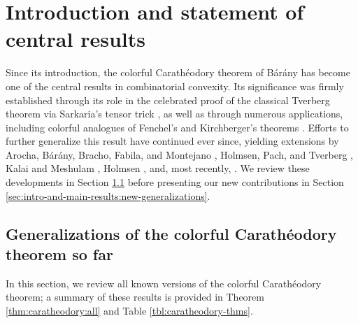 \documentclass[a4paper,11pt,reqno, english]{amsart}
\theoremstyle{definition}
\theoremstyle{remark}
\begin{document}
\maketitle


\bigskip
\section{Introduction and statement of central results}\label{sec:intro-and-main-results}
\bigskip

Since its introduction, the colorful Carath\'eodory theorem of B\'ar\'any \cite{Barany1982} has become one of the central results in combinatorial convexity. 
Its significance was firmly established through its role in the celebrated proof of the classical Tverberg theorem \cite{Tverberg1966} via Sarkaria’s tensor trick \cite{Sarkaria1992}, as well as through numerous applications, including colorful analogues of Fenchel’s and Kirchberger’s theorems \cite{Barany2021}. 
Efforts to further generalize this result have continued ever since, yielding extensions by Arocha, B\'ar\'any, Bracho, Fabila, and Montejano \cite{ArochaBaranyBrachoFabilaMontejano2009}, Holmsen, Pach, and Tverberg \cite{HolmsenPachTverberg2008}, Kalai and Meshulam \cite{KalaiMeshulam2005}, Holmsen \cite{Holmsen2016}, and, most recently, \cite{Blagojevic2025}. 
We review these developments in Section \ref{sec:intro-and-main-results:existing-generalizations} before presenting our new contributions in Section \ref{sec:intro-and-main-results:new-generalizations}.



\medskip
\subsection{Generalizations of the colorful Carath\'eodory theorem so far}\label{sec:intro-and-main-results:existing-generalizations}
\medskip

In this section, we review all known versions of the colorful Carath\'eodory theorem; a summary of these results is provided in Theorem \ref{thm:caratheodory:all} and Table \ref{tbl:caratheodory-thms}.
\end{document}
